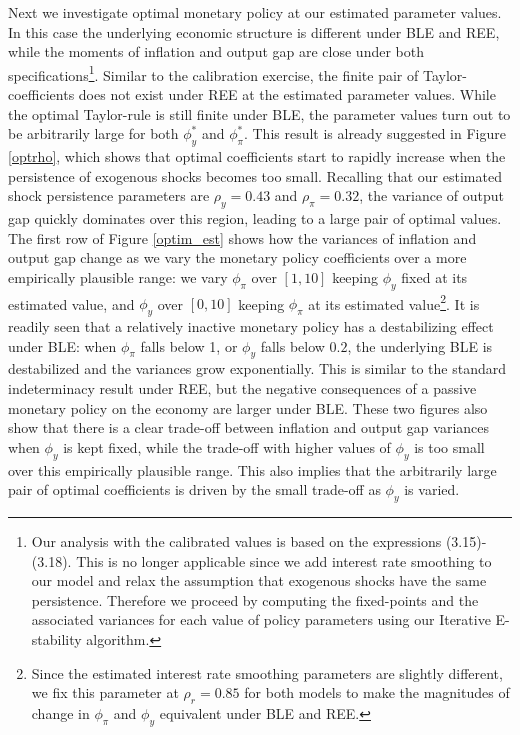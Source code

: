 Next we investigate optimal monetary policy at our estimated parameter values. In this case the underlying economic structure is different under BLE and REE, while the moments of inflation and output gap are close under both specifications\footnote{Our analysis with the calibrated values is based on the expressions (3.15)-(3.18). This is no longer applicable since we add interest rate smoothing to our model and relax the assumption that exogenous shocks have the same persistence. Therefore we proceed by computing the fixed-points and the associated variances for each value of policy parameters using our Iterative E-stability algorithm.}. Similar to the calibration exercise, the finite pair of Taylor-coefficients does not exist under REE at the estimated parameter values. While the optimal Taylor-rule is still finite under BLE, the parameter values turn out to be arbitrarily large for both $\phi_y^{*}$ and $\phi_{\pi}^{*}$. This result is already suggested in Figure \ref{optrho}, which shows that optimal coefficients start to rapidly increase when the persistence of exogenous shocks becomes too small. Recalling that our estimated shock persistence parameters are $\rho_y=0.43$ and $\rho_{\pi}=0.32$, the variance of output gap quickly dominates over this region, leading to a large pair of optimal values. The first row of Figure \ref{optim_est} shows how the variances of inflation and output gap change as we vary the monetary policy coefficients over a more empirically plausible range: we vary $\phi_{\pi}$ over $[1,10]$ keeping $\phi_y$ fixed at its estimated value, and $\phi_y$ over $[0,10]$ keeping $\phi_{\pi}$ at its estimated value\footnote{Since the estimated interest rate smoothing parameters are slightly different, we fix this parameter at $\rho_r=0.85$ for both models to make the magnitudes of change in $\phi_{\pi}$ and $\phi_y$ equivalent under BLE and REE.}. It is readily seen that a relatively inactive monetary policy has a destabilizing effect under BLE: when $\phi_{\pi}$ falls below 1, or $\phi_y$ falls below $0.2$, the underlying BLE is destabilized and the variances grow exponentially. This is similar to the standard indeterminacy result under REE, but the negative consequences of a passive monetary policy on the economy are larger under BLE.  These two figures also  show that there is a clear trade-off between inflation and output gap variances when $\phi_{y}$ is kept fixed, while the trade-off with higher values of $\phi_y$ is too small over this empirically plausible range. This also implies that the arbitrarily large pair of optimal coefficients is driven by the small trade-off as $\phi_y$ is varied. 


